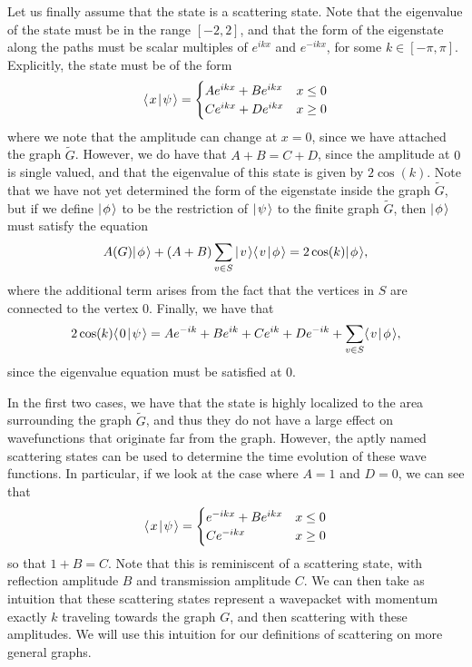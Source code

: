 \documentclass[../thesis-main/thesis-main]{subfiles}
\begin{document}
Let us finally assume that the state is a scattering state.  Note that the eigenvalue of the state must be in the range $[-2,2]$, and that the form of the eigenstate along the paths must be scalar multiples of $e^{ikx}$ and $e^{-ikx}$, for some $k\in [-\pi, \pi]$.  Explicitly, the state must be of the form
\begin{align}
  \langle\mspace{2mu} x \mspace{2mu} | \mspace{2mu} \psi\mspace{2mu} \rangle = \begin{cases} Ae^{i k x} + B e^{i k x} & x \leq 0\\
   C e^{i k x} + D e^{i k x} & x\geq 0\end{cases}
\end{align}
where we note that the amplitude can change at $x=0$, since we have attached the graph $\widetilde{G}$.  However, we do have that $A + B=C +D$, since the amplitude at $0$ is single valued, and that the eigenvalue of this state is given by $2\cos(k)$.  Note that we have not yet determined the form of the eigenstate inside the graph $\widetilde{G}$, but if we define $|\mspace{2mu} \phi \mspace{2mu} \rangle$ to be the restriction of $|\mspace{2mu} \psi \mspace{2mu} \rangle$ to the finite graph $\widetilde{G}$, then $|\mspace{2mu} \phi \mspace{2mu} \rangle$ must satisfy the equation
\begin{equation}
  A(G) |\mspace{2mu} \phi \mspace{2mu} \rangle + (A+ B)\sum_{v\in S} |\mspace{2mu} v \mspace{2mu} \rangle\langle\mspace{2mu} v \mspace{2mu} | \mspace{2mu} \phi\mspace{2mu} \rangle = 2\cos(k) |\mspace{2mu} \phi \mspace{2mu} \rangle,
\end{equation}
where the additional term arises from the fact that the vertices in $S$ are connected to the vertex $0$.  Finally, we have that
\begin{equation}
  2 \cos(k)\langle\mspace{2mu} 0 \mspace{2mu} | \mspace{2mu} \psi\mspace{2mu} \rangle = Ae^{-ik} + B e^{ik} + C e^{i k} + D e^{-ik} + \sum_{v\in S} \langle\mspace{2mu} v \mspace{2mu} | \mspace{2mu} \phi\mspace{2mu} \rangle,
\end{equation}
since the eigenvalue equation must be satisfied at $0$.

In the first two cases, we have that the state is highly localized to the area surrounding the graph $\widetilde{G}$, and thus they do not have a large effect on wavefunctions that originate far from the graph.  However, the aptly named scattering states can be used to determine the time evolution of these wave functions.  In particular, if we look at the case where $A = 1$ and $D = 0$,  we can see that
\begin{align}
  \langle\mspace{2mu} x \mspace{2mu} | \mspace{2mu} \psi\mspace{2mu} \rangle = \begin{cases} e^{-ikx} + B e^{i kx} & x\leq 0\\
  C e^{-ikx} & x \geq 0\end{cases}
\end{align}
so that $1+ B  =C$.  Note that this is reminiscent of a scattering state, with reflection amplitude $B$ and transmission amplitude $C$.  We can then take as intuition that these scattering states represent a wavepacket with momentum exactly $k$ traveling towards the graph $G$, and then scattering with these amplitudes.  We will use this intuition for our definitions of scattering on more general graphs. 
 
\end{document}
